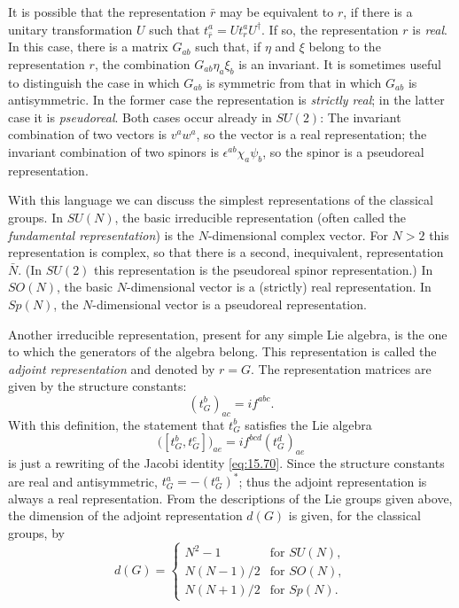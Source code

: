 It is possible that the representation $\bar{r}$ may be equivalent to $r$, if
there is a unitary transformation $U$ such that
$t^a_{\bar{r}} = Ut^a_rU^{\dagger}$.  If so, the representation $r$ is
\emph{real}.  In this case, there is a matrix $G_{ab}$ such that, if $\eta$ and
$\xi$ belong to the representation $r$, the combination
$G_{ab}\eta_a\xi_b$ is an invariant.  It is sometimes useful to distinguish
the case in which $G_{ab}$ is symmetric from that in which $G_{ab}$ is
antisymmetric.  In the former case the representation is \emph{strictly
real}; in the latter case it is \emph{pseudoreal}.  Both cases occur already
in $SU(2)$: The invariant combination of two vectors is $v^aw^a$, so the
vector is a real representation; the invariant combination of two spinors is
$\epsilon^{ab}\chi_a\psi_b$, so the spinor is a pseudoreal representation.

With this language we can discuss the simplest representations of the
classical groups.  In $SU(N)$, the basic irreducible representation (often
called the \emph{fundamental representation}) is the $N$-dimensional complex
vector.  For $N > 2$ this representation is complex, so that there is a
second, inequivalent, representation $\bar{N}$.  (In $SU(2)$ this
representation is the pseudoreal spinor representation.)  In $SO(N)$, the
basic $N$-dimensional vector is a (strictly) real representation.  In
$Sp(N)$, the $N$-dimensional vector is a pseudoreal representation.

Another irreducible representation, present for any simple Lie algebra, is
the one to which the generators of the algebra belong.  This representation
is called the \emph{adjoint representation} and denoted by $r = G$.  The
representation matrices are given by the structure constants:
\begin{equation}
  (t^b_G)_{ac} = if^{abc} .
  \label{eq:15.83}
\end{equation}
With this definition, the statement that $t^b_G$ satisfies the Lie algebra
\begin{equation}
  \bigl( [t^b_G, t^c_G] \bigr)_{ae} = if^{bcd}(t^d_G)_{ae}
  \label{eq:15.84}
\end{equation}
is just a rewriting of the Jacobi identity \eqref{eq:15.70}.  Since the
structure constants are real and antisymmetric,
$t^a_G = -(t^a_G)^{*}$; thus the adjoint representation is always a real
representation.  From the descriptions of the Lie groups given above, the
dimension of the adjoint representation $d(G)$ is given, for the classical
groups, by
\begin{equation}
  d(G) = \begin{cases}
    N^2-1 & \text{for } SU(N),\\
    N(N-1)/2 & \text{for } SO(N),\\
    N(N+1)/2 & \text{for } Sp(N) .
  \end{cases}
  \label{eq:15.85}
\end{equation}

